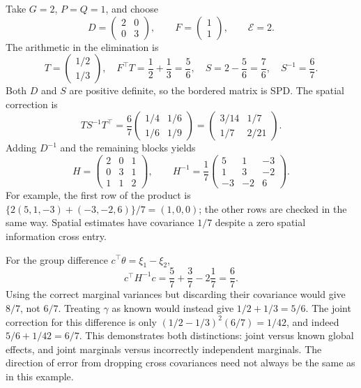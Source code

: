 Take $G=2$, $P=Q=1$, and choose
\[
 D=\begin{pmatrix}2&0\\0&3\end{pmatrix},\qquad
 F=\begin{pmatrix}1\\1\end{pmatrix},\qquad
 \mathcal E=2.
\]
The arithmetic in the elimination is
\[
 T=\begin{pmatrix}1/2\\1/3\end{pmatrix},\quad
 F^\top T=\frac12+\frac13=\frac56,\quad
 S=2-\frac56=\frac76,\quad S^{-1}=\frac67.
\]
Both $D$ and $S$ are positive definite, so the bordered matrix is SPD.
The spatial correction is
\[
 TS^{-1}T^\top=
 \frac67\begin{pmatrix}1/4&1/6\\1/6&1/9\end{pmatrix}
 =\begin{pmatrix}3/14&1/7\\1/7&2/21\end{pmatrix}.
\]
Adding $D^{-1}$ and the remaining blocks yields
\begin{equation}
 H=\begin{pmatrix}2&0&1\\0&3&1\\1&1&2\end{pmatrix},
 \qquad
 H^{-1}=\frac17
 \begin{pmatrix}5&1&-3\\1&3&-2\\-3&-2&6\end{pmatrix}.
 \label{cov-numerical-inverse}
\end{equation}
For example, the first row of the product is
$\{2(5,1,-3)+(-3,-2,6)\}/7=(1,0,0)$; the other rows
are checked in the same way.  Spatial estimates have covariance $1/7$
despite a zero spatial information cross entry.

For the group difference $c^\top\theta=\xi_1-\xi_2$,
\[
 c^\top H^{-1}c=\frac57+\frac37-2\frac17=\frac67.
\]
Using the correct marginal variances but discarding their covariance
would give $8/7$, not $6/7$.  Treating $\gamma$ as known would instead
give $1/2+1/3=5/6$.  The joint correction for this difference is only
$(1/2-1/3)^2(6/7)=1/42$, and indeed $5/6+1/42=6/7$.
This demonstrates both distinctions: joint versus known global effects,
and joint marginals versus incorrectly independent marginals.  The
direction of error from dropping cross covariances need not always be
the same as in this example.

